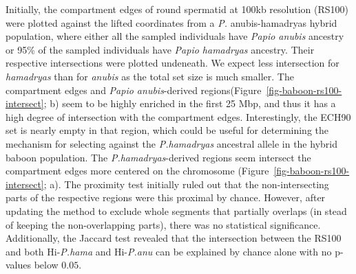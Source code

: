 \documentclass[
  11pt,
  a4paper,
]{scrbook}
\let\oldemph\emph
\renewcommand\emph[1]{\oldemph{\color{gray}#1}}
\begin{document}
Initially, the compartment edges of round spermatid at 100kb resolution
(RS100) were plotted against the lifted coordinates from a \emph{P.}
anubis-hamadryas hybrid population, where either all the sampled
individuals have \emph{Papio anubis} ancestry or 95\% of the sampled
individuals have \emph{Papio hamadryas} ancestry. Their respective
intersections were plotted undeneath. We expect less intersection for
\emph{hamadryas} than for \emph{anubis} as the total set size is much
smaller. The compartment edges and \emph{Papio anubis}-derived
regions(Figure~\ref{fig-baboon-rs100-intersect}; b) seem to be highly
enriched in the first 25 Mbp, and thus it has a high degree of
intersection with the compartment edges. Interestingly, the ECH90 set is
nearly empty in that region, which could be useful for determining the
mechanism for selecting against the \emph{P.hamadryas} ancestral allele
in the hybrid baboon population. The \emph{P.hamadryas}-derived regions
seem intersect the compartment edges more centered on the chromosome
(Figure~\ref{fig-baboon-rs100-intersect}; a). The proximity test
initially ruled out that the non-intersecting parts of the respective
regions were this proximal by chance. However, after updating the method
to exclude whole segments that partially overlaps (in stead of keeping
the non-overlapping parts), there was no statistical significance.
Additionally, the Jaccard test revealed that the intersection between
the RS100 and both Hi-\emph{P.hama} and Hi-\emph{P.anu} can be explained
by chance alone with no p-values below \(0.05\).
\end{document}
